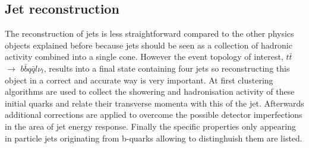 \subsection{Jet reconstruction}\label{subsec::jetReco}
The reconstruction of jets is less straightforward compared to the other physics objects explained before because jets should be seen as a collection of hadronic activity combined into a single cone. However the event topology of interest, $t\bar{t}$ $\rightarrow$ $b\bar{b}q\bar{q}l\nu_{l}$, results into a final state containing four jets so reconstructing this object in a correct and accurate way is very important.
At first clustering algorithms are used to collect the showering and hadronisation activity of these initial quarks and relate their transverse momenta with this of the jet.
Afterwards additional corrections are applied to overcome the possible detector imperfections in the area of jet energy response. Finally the specific properties only appearing in particle jets originating from b-quarks allowing to distinghuish them are listed. 

